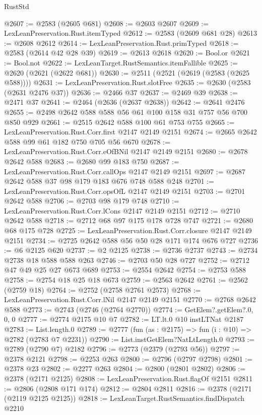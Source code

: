 \begin{lexlean}{RustStd}
\begin{coremodule}
@2607 := @2583 (@2605 @681)
@2608 := @2603 @2607
@2609 := LexLeanPreservation.Rust.itemTyped
@2612 := @2583 (@2609 @681 @28)
@2613 := @2608 @2612
@2614 := LexLeanPreservation.Rust.primTyped
@2618 := @2583 (@2614 @42 @28 @39)
@2619 := @2613 @2618
@2620 := Bool.or
@2621 := Bool.not
@2622 := LexLeanTarget.RustSemantics.itemFallible
@2625 := @2620 (@2621 (@2622 @681))
@2630 := @2511 (@2521 (@2619 (@2583 (@2625 @588))))
@2631 := LexLeanPreservation.Rust.slotFree
@2635 := @2630 (@2583 (@2631 @2476 @37))
@2636 := @2466 @37
@2637 := @2469 @39
@2638 := @2471 @37
@2641 := @2464 (@2636 (@2637 @2638))
@2642 := @2641 @2476
@2655 := @2498 @2642 @588 @588 @56 @61 @100 @158 @31 @757 @56 @700 @850 @929
@2661 := @2515 @2642 @588 @100 @61 @753 @755
@2665 := LexLeanPreservation.Rust.Corr.first @2147 @2149 @2151
@2674 := @2665 @2642 @588 @99 @61 @182 @750 @705 @56 @670
@2678 := LexLeanPreservation.Rust.Corr.eOfBNil @2147 @2149 @2151
@2680 := @2678 @2642 @588
@2683 := @2680 @99 @183 @750
@2687 := LexLeanPreservation.Rust.Corr.callOps @2147 @2149 @2151
@2697 := @2687 @2642 @588 @37 @98 @179 @183 @676 @748 @588 @248
@2701 := LexLeanPreservation.Rust.Corr.opsOfL @2147 @2149 @2151
@2703 := @2701 @2642 @588
@2706 := @2703 @98 @179 @748
@2710 := LexLeanPreservation.Rust.Corr.lCons @2147 @2149 @2151
@2712 := @2710 @2642 @588
@2718 := @2712 @68 @97 @175 @178 @728 @747
@2721 := @2680 @68 @175 @728
@2725 := LexLeanPreservation.Rust.Corr.closure @2147 @2149 @2151
@2734 := @2725 @2642 @588 @56 @50 @28 @171 @174 @676 @727
@2736 := @6 @2125 @620
@2737 := @2 @2125
@2738 := @2736 @2737
@2743 := @2734 @2738 @18 @588 @588 @263
@2746 := @2703 @50 @28 @727
@2752 := @2712 @47 @49 @25 @27 @673 @689
@2753 := @2554 @2642
@2754 := @2753 @588
@2758 := @2754 @18 @25 @18 @673
@2759 := @2563 @2642
@2761 := @2562 (@2759 @18)
@2764 := @2752 (@2758 @2761 @2573)
@2768 := LexLeanPreservation.Rust.Corr.lNil @2147 @2149 @2151
@2770 := @2768 @2642 @588
@2773 := @2743 (@2746 (@2764 @2770))
@2774 := GetElem?.getElem?.{0, 0, 0}
@2777 := @2774 @2175 @10 @7
@2782 := LT.lt.{0} @10 instLTNat @2187
@2783 := List.length.{0}
@2789 := @2777 (fun (as : @2175) => fun (i : @10) => @2782 (@2783 @7 @2231))
@2790 := List.instGetElem?NatLtLength.{0}
@2793 := @2789 (@2790 @7) @2182
@2796 := @2773 (@2379 (@2793 @56))
@2797 := @2378 @2121
@2798 := @2253 @263
@2800 := @2796 (@2797 @2798)
@2801 := @2378 @23
@2802 := @2277 @263
@2804 := @2800 (@2801 @2802)
@2806 := @2378 (@2171 @2125)
@2808 := LexLeanPreservation.Rust.flagOf @2151
@2811 := @2806 (@2808 @171 @174)
@2812 := @2804 @2811
@2816 := @2378 (@2171 (@2119 @2125 @2125))
@2818 := LexLeanTarget.RustSemantics.findDispatch @2210

\end{coremodule}
\end{lexlean}
